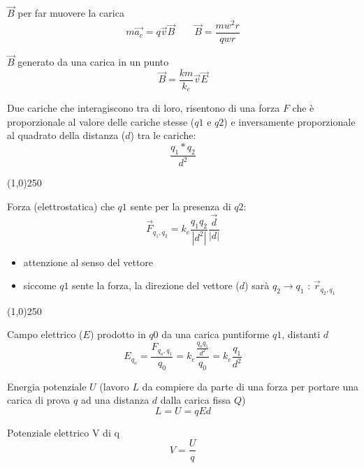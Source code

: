 \documentclass[14pt]{extarticle}
\begin{document}
$\overrightarrow{B}$ per far muovere la carica
\begin{equation*}
    m\overrightarrow{a_c}=q\overrightarrow{v}\overrightarrow{B}
    \quad\quad
    \overrightarrow{B}=\frac{mw^2r}{qwr}
\end{equation*}

$\overrightarrow{B}$ generato da una carica in un punto
\begin{equation*}
    \overrightarrow{B}=\frac{km}{k_e}\overrightarrow{v}\overrightarrow{E}
\end{equation*}



Due cariche che interagiscono tra di loro, risentono di una forza $F$ che è proporzionale al valore delle cariche stesse ($q1$ e $q2$) e inversamente proporzionale al quadrato della distanza ($d$) tra le cariche:
\begin{equation*}
    \frac{q_1*q_2}{d^2}
\end{equation*}
\begin{center}
    \line(1,0){250}
\end{center}
Forza (elettrostatica) che $q1$ sente per la presenza di $q2$:
\begin{equation*}
    \overrightarrow{F}_{q_1,q_2}=k_e\frac{q_1q_2}{|d^2|}\frac{\overrightarrow{d}}{|d|}
\end{equation*}
\begin{itemize}
    \item attenzione al senso del vettore
    \item siccome $q1$ sente la forza, la direzione del vettore ($d$) sarà $q_2\rightarrow q_1$ : $\overrightarrow{r}_{q_2,q_1}$
\end{itemize}


\begin{center}
    \line(1,0){250}
\end{center}
Campo elettrico ($E$) prodotto in $q0$ da una carica puntiforme $q1$, distanti $d$
\begin{equation*}
    E_{q_o}=\frac{F_{q_o,q_1}}{q_0}=k_e\frac{\frac{q_oq_1}{d^2}}{q_0}=k_e\frac{q_1}{d^2}
\end{equation*}

Energia potenziale $U$ (lavoro $L$ da compiere da parte di una forza per portare una carica di prova $q$ ad una distanza $d$ dalla carica fissa $Q$)
\begin{equation*}
    L=U=qEd
\end{equation*}


Potenziale elettrico V di q
\begin{equation*}
    V=\frac{U}{q}
\end{equation*}
\end{document}

